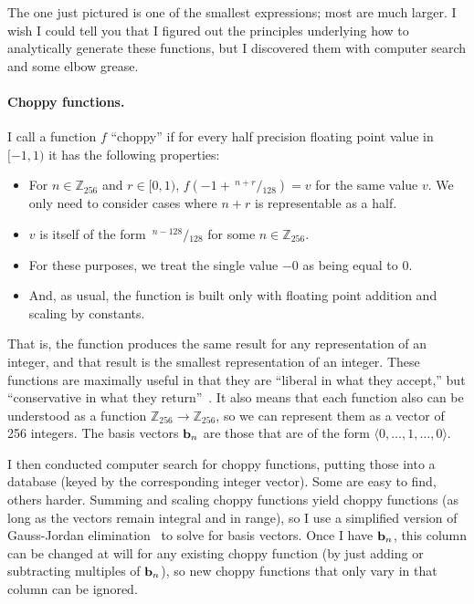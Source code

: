 \documentclass[twocolumn]{article}
\newcommand\sfrac[2]{\!{}\,^{#1}\!/{}\!_{#2}}
\newcommand\basis{\ensuremath{\textrm{\bf b}}}
\begin{document}
The one just pictured is one of the smallest expressions; most are
much larger. I wish I could tell you that I figured out the principles
underlying how to analytically generate these functions, but I
discovered them with computer search and some elbow grease.

\paragraph{Choppy functions.}
I call a function $f$ ``choppy'' if for every half precision floating point value in
$[-1, 1)$ it has the following properties:

\begin{itemize}
\item For $n \in \mathbb{Z}_{256}$ and $r \in [0, 1)$,
  $f(-1 + \sfrac{n + r}{128}) = v$ for the same value $v$. We only need to
  consider cases where $n + r$ is representable as a half.
\item $v$ is itself of the form $\sfrac{n - 128}{128}$ for some $n \in \mathbb{Z}_{256}$.
\item For these purposes, we treat the single value $-0$ as being equal to $0$.
\item And, as usual, the function is built only with floating point addition
  and scaling by constants.
\end{itemize}

That is, the function produces the same result for any representation
of an integer, and that result is the smallest representation of an
integer. These functions are maximally useful in that they are
``liberal in what they accept,'' but ``conservative in what they
return''~\cite{rfc761}. It also means that each function also can be
understood as a function $\mathbb{Z}_{256} \rightarrow
\mathbb{Z}_{256}$, so we can represent them as a vector of 256
integers. The basis vectors $\basis_n$ are those that are of the form
$\langle 0, \ldots, 1, \ldots, 0\rangle$.

I then conducted computer search for choppy functions, putting those
into a database (keyed by the corresponding integer vector). Some are
easy to find, others harder. Summing and scaling choppy functions
yield choppy functions (as long as the vectors remain integral and in
range), so I use a simplified version of Gauss-Jordan
elimination~\cite{gaussjordan} to solve for basis vectors. Once I have
$\basis_n$, this column can be changed at will for any existing choppy
function (by just adding or subtracting multiples of $\basis_n$), so
new choppy functions that only vary in that column can be ignored.
\end{document}
